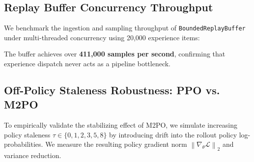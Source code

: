 \documentclass[10pt,twocolumn,letterpaper]{article}
\begin{document}
\subsection{Replay Buffer Concurrency Throughput}

We benchmark the ingestion and sampling throughput of \texttt{BoundedReplayBuffer} under multi-threaded concurrency using 20,000 experience items:

\begin{table}[t]
\centering
\caption{Replay buffer concurrency and throughput benchmark.}
\label{tab:buffer}
\end{table}

The buffer achieves over \textbf{411,000 samples per second}, confirming that experience dispatch never acts as a pipeline bottleneck.

\subsection{Off-Policy Staleness Robustness: PPO vs. M2PO}

To empirically validate the stabilizing effect of M2PO, we simulate increasing policy staleness $\tau \in \{0, 1, 2, 3, 5, 8\}$ by introducing drift into the rollout policy log-probabilities. We measure the resulting policy gradient norm $\left\| \nabla_\theta \mathcal{L} \right\|_2$ and variance reduction.

\begin{table}[t]
\centering
\caption{Gradient variance reduction of M2PO vs. standard PPO under increasing asynchronous staleness $\tau$.}
\label{tab:staleness}
\end{table}
\end{document}
